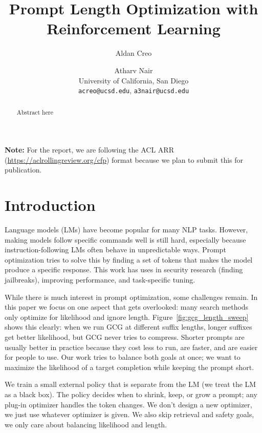 \documentclass[11pt]{article}
\title{Prompt Length Optimization with Reinforcement Learning}
\author{Aldan Creo \and Atharv Nair \\
  University of California, San Diego \\
  \texttt{acreo@ucsd.edu}, \texttt{a3nair@ucsd.edu}}
\begin{document}
\maketitle
\begin{abstract}
  Abstract here
\end{abstract}

\begin{mdframed}[linewidth=1pt, linecolor=black!30, backgroundcolor=black!5]
  \noindent\textbf{Note:} For the report, we are following the ACL ARR (\url{https://aclrollingreview.org/cfp}) format because we plan to submit this for publication.
\end{mdframed}

\section{Introduction}
\label{sec:introduction}

Language models (LMs) have become popular for many NLP tasks. However, making models follow specific commands well is still hard, especially because instruction-following LMs often behave in unpredictable ways. Prompt optimization tries to solve this by finding a set of tokens that makes the model produce a specific response. This work has uses in security research (finding jailbreaks), improving performance, and task-specific tuning.

While there is much interest in prompt optimization, some challenges remain. In this paper we focus on one aspect that gets overlooked: many search methods only optimize for likelihood and ignore length. Figure~\ref{fig:gcg_length_sweep} shows this clearly: when we run GCG at different suffix lengths, longer suffixes get better likelihood, but GCG never tries to compress. Shorter prompts are usually better in practice because they cost less to run, are faster, and are easier for people to use. Our work tries to balance both goals at once; we want to maximize the likelihood of a target completion while keeping the prompt short.

We train a small external policy that is separate from the LM (we treat the LM as a black box). The policy decides when to shrink, keep, or grow a prompt; any plug-in optimizer handles the token changes. We don't design a new optimizer, we just use whatever optimizer is given. We also skip retrieval and safety goals, we only care about balancing likelihood and length.
\end{document}

